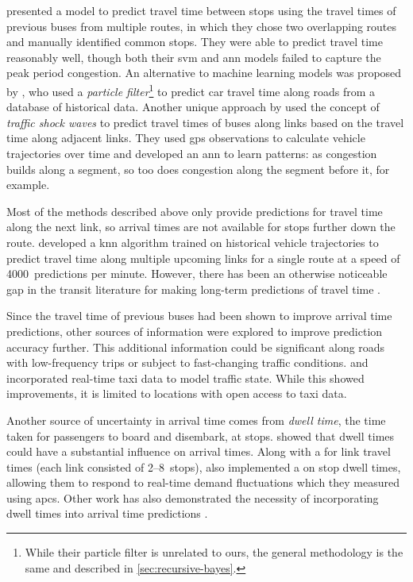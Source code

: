  presented a model to predict travel time between stops using the travel times of previous buses from multiple routes, in which they chose two overlapping routes and manually identified common stops. They were able to predict travel time reasonably well, though both their \gls{svm} and \gls{ann} models failed to capture the peak period congestion. An alternative to machine learning models was proposed by \citet{Chen_2014}, who used a \emph{particle filter}\footnote{While their particle filter is unrelated to ours, the general methodology is the same and described in \cref{sec:recursive-bayes}.} to predict car travel time along roads from a database of historical data. Another unique approach by \citet{Julio_2016} used the concept of \emph{traffic shock waves} to predict travel times of buses along links based on the travel time along adjacent links. They used \gls{gps} observations to calculate vehicle trajectories over time and developed an \gls{ann} to learn patterns: as congestion builds along a segment, so too does congestion along the segment before it, for example.


Most of the methods described above only provide predictions for travel time along the next link, so arrival times are not available for stops further down the route.  developed a \gls{knn} algorithm trained on historical vehicle trajectories to predict travel time along multiple upcoming links for a single route at a speed of 4000~predictions per minute. However, there has been an otherwise noticeable gap in the transit literature for making long-term predictions of travel time \citep{Moreira_2015}.


Since the travel time of previous buses had been shown to improve arrival time predictions, other sources of information were explored to improve prediction accuracy further. This additional information could be significant along roads with low-frequency trips or subject to fast-changing traffic conditions.  and \citet{Ma_2019} incorporated real-time taxi data to model traffic state. While this showed improvements, it is limited to locations with open access to taxi data.


Another source of uncertainty in arrival time comes from \emph{dwell time}, the time taken for passengers to board and disembark, at stops.  showed that dwell times could have a substantial influence on arrival times. Along with a \kf{} for link travel times (each link consisted of 2--8~stops), \citeauthor{Shalaby_2004} also implemented a \kf{} on stop dwell times, allowing them to respond to real-time demand fluctuations which they measured using \glspl{apc}. Other work has also demonstrated the necessity of incorporating dwell times into arrival time predictions \citep{Jeong_2005,Cats_2015,Cats_2016}.


